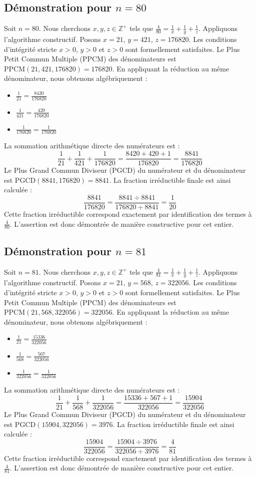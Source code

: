 \documentclass[11pt,a4paper]{article}
\begin{document}
\subsection{Démonstration pour $n = 80$}
Soit $n = 80$. Nous cherchons $x, y, z \in \mathbb{Z}^{+}$ tels que $\frac{4}{80} = \frac{1}{x} + \frac{1}{y} + \frac{1}{z}$.
Appliquons l'algorithme constructif. Posons $x = 21$, $y = 421$, $z = 176820$.
Les conditions d'intégrité stricte $x > 0$, $y > 0$ et $z > 0$ sont formellement satisfaites.
Le Plus Petit Commun Multiple (PPCM) des dénominateurs est $\text{PPCM}(21, 421, 176820) = 176820$.
En appliquant la réduction au même dénominateur, nous obtenons algébriquement :
\begin{itemize}
    \item $\frac{1}{21} = \frac{8420}{176820}$
    \item $\frac{1}{421} = \frac{420}{176820}$
    \item $\frac{1}{176820} = \frac{1}{176820}$
\end{itemize}
La sommation arithmétique directe des numérateurs est :
$$ \frac{1}{21} + \frac{1}{421} + \frac{1}{176820} = \frac{8420 + 420 + 1}{176820} = \frac{8841}{176820} $$
Le Plus Grand Commun Diviseur (PGCD) du numérateur et du dénominateur est $\text{PGCD}(8841, 176820) = 8841$.
La fraction irréductible finale est ainsi calculée :
$$ \frac{8841}{176820} = \frac{8841 \div 8841}{176820 \div 8841} = \frac{1}{20} $$
Cette fraction irréductible correspond exactement par identification des termes à $\frac{4}{80}$. L'assertion est donc démontrée de manière constructive pour cet entier.

\subsection{Démonstration pour $n = 81$}
Soit $n = 81$. Nous cherchons $x, y, z \in \mathbb{Z}^{+}$ tels que $\frac{4}{81} = \frac{1}{x} + \frac{1}{y} + \frac{1}{z}$.
Appliquons l'algorithme constructif. Posons $x = 21$, $y = 568$, $z = 322056$.
Les conditions d'intégrité stricte $x > 0$, $y > 0$ et $z > 0$ sont formellement satisfaites.
Le Plus Petit Commun Multiple (PPCM) des dénominateurs est $\text{PPCM}(21, 568, 322056) = 322056$.
En appliquant la réduction au même dénominateur, nous obtenons algébriquement :
\begin{itemize}
    \item $\frac{1}{21} = \frac{15336}{322056}$
    \item $\frac{1}{568} = \frac{567}{322056}$
    \item $\frac{1}{322056} = \frac{1}{322056}$
\end{itemize}
La sommation arithmétique directe des numérateurs est :
$$ \frac{1}{21} + \frac{1}{568} + \frac{1}{322056} = \frac{15336 + 567 + 1}{322056} = \frac{15904}{322056} $$
Le Plus Grand Commun Diviseur (PGCD) du numérateur et du dénominateur est $\text{PGCD}(15904, 322056) = 3976$.
La fraction irréductible finale est ainsi calculée :
$$ \frac{15904}{322056} = \frac{15904 \div 3976}{322056 \div 3976} = \frac{4}{81} $$
Cette fraction irréductible correspond exactement par identification des termes à $\frac{4}{81}$. L'assertion est donc démontrée de manière constructive pour cet entier.
\end{document}
